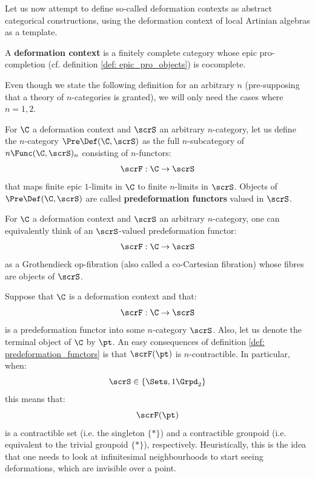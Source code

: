         Let us now attempt to define so-called deformation contexts as abstract categorical constructions, using the deformation context of local Artinian algebras as a template.
        \begin{definition} \label{def: deformation_context}
            A \textbf{deformation context} is a finitely complete category whose epic pro-completion (cf. definition \ref{def: epic_pro_objects}) is cocomplete. 
        \end{definition}
        Even though we state the following definition for an arbitrary $n$ (pre-supposing that a theory of $n$-categories is granted), we will only need the cases where $n = 1, 2$. 
        \begin{definition} \label{def: predeformation_functors}
            For $\C$ a deformation context and $\scrS$ an arbitrary $n$-category, let us define the $n$-category $\Pre\Def(\C, \scrS)$ as the full $n$-subcategory of $n\-\Func(\C, \scrS)_n$ consisting of $n$-functors:
                $$\scrF: \C \to \scrS$$
            that maps finite epic $1$-limits in $\C$ to finite $n$-limits in $\scrS$. Objects of $\Pre\Def(\C, \scrS)$ are called \textbf{predeformation functors} valued in $\scrS$. 
        \end{definition}
        \begin{remark}
            For $\C$ a deformation context and $\scrS$ an arbitrary $n$-category, one can equivalently think of an $\scrS$-valued predeformation functor:
                $$\scrF: \C \to \scrS$$
            as a Grothendieck op-fibration (also called a co-Cartesian fibration) whose fibres are objects of $\scrS$. 
        \end{remark}
        \begin{remark}
            Suppose that $\C$ is a deformation context and that:
                $$\scrF: \C \to \scrS$$
            is a predeformation functor into some $n$-category $\scrS$. Also, let us denote the terminal object of $\C$ by $\pt$. An easy consequences of definition \ref{def: predeformation_functors} is that $\scrF(\pt)$ is $n$-contractible. In particular, when:
                $$\scrS \in \{\Sets, 1\-\Grpd_2\}$$
            this means that:
                $$\scrF(\pt)$$
            is a contractible set (i.e. the singleton $\{*\}$) and a contractible groupoid (i.e. equivalent to the trivial groupoid $\{*\}$), respectively. Heuristically, this is the idea that one needs to look at infinitesimal neighbourhoods to start seeing deformations, which are invisible over a point.
        \end{remark}
